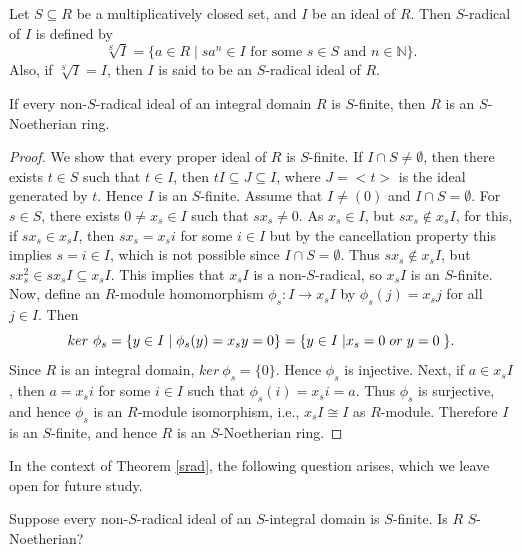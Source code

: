 \documentclass[11pt]{article}
\begin{document}
	\begin{deff}\cite[Definition 2.1]{ut25}
		Let $S\subseteq R$ be a multiplicatively closed set, and $I$ be an ideal of $R$. Then $S$-radical of $I$ is defined by
		$$\sqrt[S]{I} = \{a \in R \mid sa^n \in I \text{ for some } s \in S \text{ and } n \in \mathbb{N}\}.
		$$ Also, if $\sqrt[S]{I} =I$, then $I$ is said to be an $S$-radical ideal of $R$.
	\end{deff}
	\begin{theorem}\label{srad}
		If every non-$S$-radical ideal of an integral domain $R$ is $S$-finite, then $R$ is an $S$-Noetherian ring.
	\end{theorem}
	\begin{proof}
		We show that every proper ideal of $R$ is $S$-finite. If $I\cap S\neq\emptyset$, then there exists $t\in S$ such that $t\in I$, then $tI\subseteq J\subseteq I$, where $J=<t>$ is the ideal generated by $t$. Hence $I$ is an $S$-finite. Assume that $I\neq (0)$ and $I\cap S=\emptyset$. For $s\in S$, there exists $0\neq x_{s}\in I$ such that $sx_{s}\neq 0$. As $x_{s}\in I$, but $sx_{s}\notin x_{s}I$, for this, if $sx_{s}\in x_{s}I$, then $sx_{s}=x_{s}i$ for some $i\in I$ but by the cancellation property this implies $s=i\in I$, which is not possible since $I\cap S=\emptyset$. Thus $sx_{s}\notin x_{s}I$, but $sx_{s}^{2}\in sx_{s}I\subseteq x_{s}I$. This implies that $x_{s}I$ is a non-$S$-radical, so $x_{s}I$ is an $S$-finite. Now, define an $R$-module homomorphism $\phi_{s} :I\rightarrow x_{s}I$ by $\phi_{s}(j)=x_{s}j$ for all $j\in I$. Then $$ker~\phi_{s}=\{y\in I\hspace{0.1cm}|\hspace{0.1cm}\phi_{s}(y)=x_{s}y=0\} =\{y\in I\hspace{0.1cm}| x_{s}=0 \hspace{0.1cm}or \hspace{0.1cm} y=0 \hspace{0.1cm} \}.$$
		Since $R$ is an integral domain, $ker~\phi_{s}=\{0\}$. Hence $\phi_{s}$ is injective. Next, if $a\in x_{s}I$, then $a=x_{s}i$ for some $i\in I$ such that $\phi_{s}(i)=x_{s}i=a$. Thus $\phi_{s}$ is surjective, and hence $\phi_{s}$ is an $R$-module isomorphism, i.e., $x_{s}I\cong I$ as $R$-module. Therefore $I$ is an $S$-finite, and hence $R$ is an $S$-Noetherian ring.
	\end{proof}
In the context of Theorem \ref{srad}, the following question arises, which we leave open for future study.
   
	\begin{question}
		Suppose every non-$S$-radical ideal of an $S$-integral domain is $S$-finite. Is $R$ $S$-Noetherian?
	\end{question}
	
\end{document}
